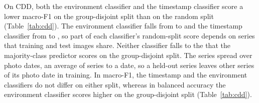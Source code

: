 \documentclass[preprint,12pt,authoryear,nopreprintline]{elsarticle}
\begin{document}
On CDD, both the environment classifier and the timestamp classifier score a lower
macro-F1 on the group-disjoint split than on the random split (Table~\ref{tab:cdd}).
The environment classifier falls from \cddEnvRandom{} to \cddEnvGroup{} and the
timestamp classifier from \cddTimestampRandom{} to \cddTimestampGroup{}, so part of
each classifier's random-split score depends on series that training and test
images share. Neither classifier falls to the \cddBaseGroup{} that the majority-class
predictor scores on the group-disjoint split. The \cddSeries{} series spread over
\cddDates{} photo dates, an average of \cddSeriesPerDate{} series to a date, so a
held-out series leaves other series of its photo date in training. In macro-F1, the
timestamp and the environment classifiers do not differ on either split, whereas in
balanced accuracy the environment classifier scores higher on the group-disjoint split
(Table~\ref{tab:cdd}).
\end{document}
